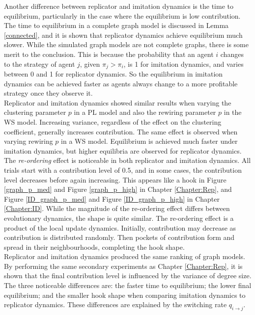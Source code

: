 Another difference between replicator and imitation dynamics is the time to equilibrium, particularly in the case where the equilibrium is low contribution. The time to equilibrium in a complete graph model is discussed in Lemma \ref{connected}, and it is shown that replicator dynamics achieve equilibrium much slower. While the simulated graph models are not complete graphs, there is some merit to the conclusion. This is because the probability that an agent $i$ changes to the strategy of agent $j$, given $\pi_j>\pi_i$, is 1 for imitation dynamics, and varies between 0 and 1 for replicator dynamics. So the equilibrium in imitation dynamics can be achieved faster as agents always change to a more profitable strategy once they observe it. \\



Replicator and imitation dynamics showed similar results when varying the clustering parameter $p$ in a PL model and also the rewiring parameter $p$ in the WS model. Increasing variance, regardless of the effect on the clustering coefficient, generally increases contribution. The same effect is observed when varying rewiring $p$ in a WS model. Equilibrium is achieved much faster under imitation dynamics, but higher equilibria are observed for replicator dynamics.  \\

The \emph{re-ordering} effect is noticeable in both replicator and imitation dynamics. All trials start with a contribution level of 0.5, and in some cases, the contribution level decreases before again increasing. This appears like a hook in Figure \ref{graph_p_med} and Figure \ref{graph_p_high} in Chapter \ref{Chapter:Rep}, and Figure \ref{ID_graph_p_med} and Figure \ref{ID_graph_p_high} in Chapter \ref{Chapter:ID}. While the magnitude of the re-ordering effect differs between evolutionary dynamics, the shape is quite similar. The re-ordering effect is a product of the local update dynamics. Initially, contribution may decrease as contribution is distributed randomly. Then pockets of contribution form and spread in their neighbourhoods, completing the hook shape.\\

Replicator and imitation dynamics produced the same ranking of graph models. By performing the same secondary experiments as Chapter \ref{Chapter:Rep}, it is shown that the final contribution level is influenced by the variance of degree size. The three noticeable differences are: the faster time to equilibrium; the lower final equilibrium; and the smaller hook shape when comparing imitation dynamics to replicator dynamics. These differences are explained by the switching rate $q_{i\to j}$. 











